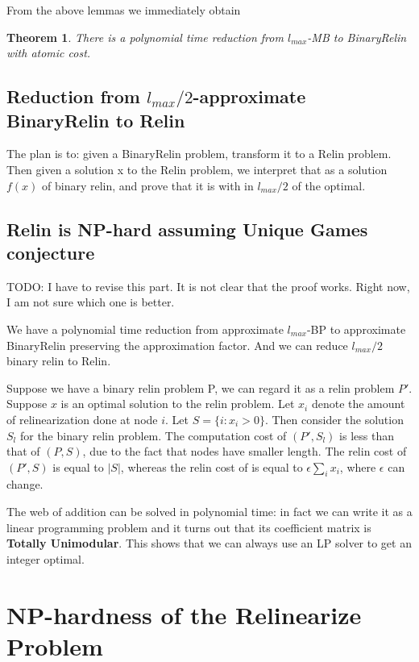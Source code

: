 \documentclass[11pt]{article} %
\theoremstyle{plain}
\newtheorem{theorem}{Theorem}
\theoremstyle{definition}
\begin{document}
From the above lemmas we immediately obtain
\begin{theorem}
There is a polynomial time reduction from $l_{max}$-MB to BinaryRelin with atomic cost. 
\end{theorem}

\subsection{Reduction from $l_{max} / 2$-approximate BinaryRelin to Relin}

The plan is to: given a BinaryRelin problem, transform it to a Relin problem. 
Then given a solution x to the Relin problem, we interpret that as a solution $f(x)$ of binary relin, and prove that it is with in $l_{max}/2$ of the optimal. 

\subsection{Relin is NP-hard assuming Unique Games conjecture}  

TODO: I have to revise this part. It is not clear that the proof works. Right now, I am not sure which one is better. 


We have a polynomial time reduction from approximate $l_{max}$-BP to 
approximate BinaryRelin preserving the approximation factor.  And we can reduce $l_{max}/2$ binary relin to Relin. 

Suppose we have a binary relin problem P, we can regard it as a relin problem $P'$. Suppose $x$ is an optimal solution to the relin problem. Let $x_i$ denote the amount of relinearization done at node $i$. Let $S = \{i: x_i > 0\}$. 
Then consider the solution $S_l$ for the binary relin problem. The computation cost of $(P', S_l)$ is less than that of $(P, S)$, due to the fact that nodes have smaller length.  The relin cost of $(P', S)$ is equal to $|S|$, 
whereas the relin cost of is equal to $\epsilon \sum_i x_i$, where $\epsilon$ can change.  


The web of addition can be solved in polynomial time: in fact we can write it as a linear programming problem and it turns out that its coefficient matrix is {\bf Totally Unimodular}. This shows that we can always use an LP solver to get an integer optimal. 

\fi

\section{NP-hardness of the Relinearize Problem}
\end{document}
